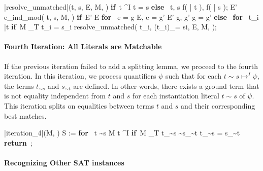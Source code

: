 \documentclass{llncs}
\def\IF{\qtab\keyword{if}\ }
\def\ELSE{\untab\qtab\keyword{else}\ }
\def\FI{\untab}
\def\RETURN{\keyword{return}\ }
\def\ENDPROC{\untab}
\def\DOFOR{\qtab\keyword{for}\ }
\def\ENDFOR{\untab}
\def\keyword#1{\mbox{\normalshape\bf #1}}
\begin{document}
\begin{minipage}[t]{.4\linewidth}
\begin{program}
\PROC |resolve\_unmatched|(t, s, E, M, \psi) \BODY
\IF t \mapsto^I \emptyset
   t = s
\ELSE
  t, s  f( \bar{ t } ), f( \bar{ s } );
   E' \in e\_ind\_mod( t, s, M, \psi ) 
  \IF E'  E
    \DOFOR {} e = g \in E, e = g' \in E'  g, g' 
       g = g'
    \ENDFOR
  \ELSE
    \DOFOR {} t_i \in \bar{t}
      \IF M \not\models_T t_i = s_i
        resolve\_unmatched( t_i, (t_i)_{= si}, E, M, \psi );
      \FI
    \ENDFOR 
  \FI
\FI
\ENDPROC
\end{program}
\end{minipage}

\paragraph{Fourth Iteration: All Literals are Matchable}

If the previous iteration failed to add a splitting lemma, we proceed to the fourth iteration.
In this iteration, we process quantifiers $\psi$ such that for each $t \sim s \mapsto^I \psi$, the terms $t_{\sim s}$ and $s_{\sim t}$ are defined.
In other words, there exists a ground term that is not equality independent from $t$ and $s$ for each instantiation literal $t \sim s$ of $\psi$.
This iteration splits on equalities between terms $t$ and $s$ and their corresponding best matches.

\begin{minipage}[t]{.4\linewidth}
\begin{program}
\PROC |iteration\_4|(M, \psi) \BODY
S := \emptyset
\DOFOR {} t \sim s \in M  t \mapsto^I \psi
  \IF M \not\models_T t_{\sim s} \sim s_{\sim t}
     t_{\sim s} = s_{\sim t}
  \FI
\ENDFOR
\RETURN \emptyset;
\ENDPROC
\end{program}
\end{minipage}

\paragraph{Recognizing Other SAT instances}
\end{document}
